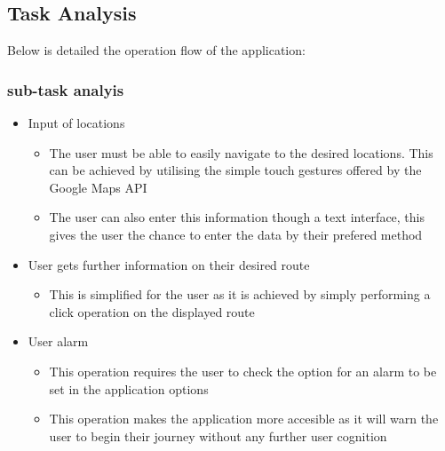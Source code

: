 \documentclass[paper=a4, fontsize=12pt]{scrartcl} %
\numberwithin{equation}{section} %
\numberwithin{figure}{section} %
\numberwithin{table}{section} %
\begin{document}
        \pagebreak
        \subsection{Task Analysis}

            Below is detailed the operation flow of the application:

            \pagebreak
            \subsubsection{sub-task analyis}
                \begin{itemize}
                    \item Input of locations
                        \begin{itemize}
                            \item The user must be able to easily navigate to the desired locations. This can be achieved by utilising the simple touch gestures offered by the Google Maps API
                            \item The user can also enter this information though a text interface, this gives the user the chance to enter the data by their prefered method
                        \end{itemize}

                    \item User gets further information on their desired route
                        \begin{itemize}
                            \item This is simplified for the user as it is achieved by simply performing a click operation on the displayed route
                        \end{itemize}

                    \item User alarm
                        \begin{itemize}
                            \item This operation requires the user to check the option for an alarm to be set in the application options
                            \item This operation makes the application more accesible as it will warn the user to begin their journey without any further user cognition
                        \end{itemize}
                \end{itemize}
\end{document}
